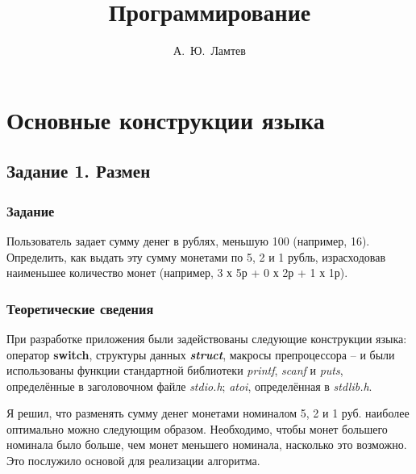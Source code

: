 \documentclass[12pt,a4paper]{report}
\author{А.~Ю.~Ламтев}
\title{Программирование}
\begin{document}
\maketitle
\chapter{Основные конструкции языка}
\section{Задание 1. Размен}
\subsection{Задание}
\hspace{\parindent}
Пользователь задает сумму денег в рублях, меньшую 100 (например, 16). Определить, как выдать эту сумму монетами по 5, 2 и 1 рубль, израсходовав наименьшее количество монет (например, 3 х 5р + 0 х 2р + 1 х 1р).
\subsection{Теоретические сведения}

\hspace{\parindent}
При разработке приложения были задействованы следующие конструкции языка: оператор \textbf{switch}, структуры данных \textit{\textbf{struct}}, макросы препроцессора -- и были использованы функции стандартной библиотеки \textit{printf}, \textit{scanf} и \textit{puts}, определённые в заголовочном файле \textit{stdio.h}; \textit{atoi}, определённая в \textit{stdlib.h}. 

\hspace{\parindent}
Я решил, что разменять сумму денег монетами номиналом 5, 2 и 1 руб. наиболее оптимально можно следующим образом. Необходимо, чтобы монет большего номинала было больше, чем монет меньшего номинала, насколько это возможно. Это послужило основой для реализации алгоритма.
\end{document}
